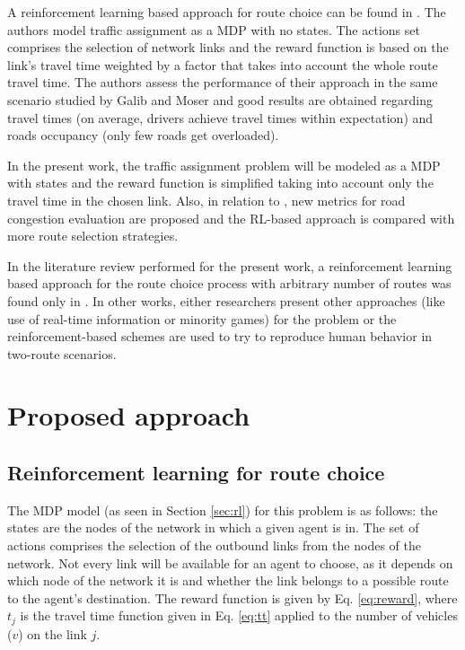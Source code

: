 \documentclass{RITA}
\newcommand{\travTime}{\ensuremath{t_j}} 	%
\newcommand{\veh}{\ensuremath{v}}		%
\begin{document}
A reinforcement learning based approach for route choice can be found in \cite{Tavares&Bazzan2012}. The authors model traffic assignment as a MDP with no states. The actions set comprises the selection of network links and the reward function is based on the link's travel time weighted by a factor that takes into account the whole route travel time. The authors assess the performance of their approach in the same scenario studied by Galib and Moser \cite{Galib&Moser2011} and good results are obtained regarding travel times (on average, drivers achieve travel times within expectation) and roads occupancy (only few roads get overloaded). 

In the present work, the traffic assignment problem will be modeled as a MDP with states and the reward function is simplified taking into account only the travel time in the chosen link. Also, in relation to \cite{Tavares&Bazzan2012}, new metrics for road congestion evaluation are proposed and the RL-based approach is compared with more route selection strategies. %

In the literature review performed for the present work, a reinforcement learning based approach for the route choice process with arbitrary number of routes was found only in \cite{Tavares&Bazzan2012}. In other works, either researchers present other approaches (like use of real-time information or minority games) for the problem or the reinforcement-based schemes are used to try to reproduce human behavior in two-route scenarios.

\section{Proposed approach}
\label{sec:proposal}

\subsection{Reinforcement learning for route choice}

The MDP model (as seen in Section \ref{sec:rl}) for this problem is as follows: the states are the nodes of the  network in which a given agent is in. The set of actions comprises the selection of the outbound links from the nodes of the network. Not every link will be available for an agent to choose, as it depends on which node of the network it is and whether the link belongs to a possible route to the agent's destination. The reward function is given by Eq. \eqref{eq:reward}, where $\travTime$ is the travel time function given in Eq. \eqref{eq:tt} applied to the number of vehicles ($\veh$) on the link $j$.
\end{document}
